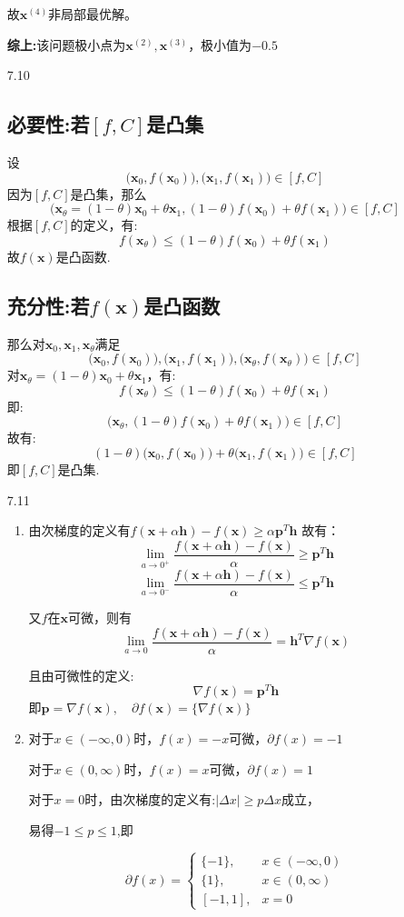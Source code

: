 \documentclass[UTF8]{ctexart}
\begin{document}
\begin{enumerate}
故$\bm{x}^{(4)}$非局部最优解。

\textbf{综上:}该问题极小点为$\bm{x}^{(2)},\bm{x}^{(3)}$，极小值为$-0.5$

\item[7.10]
\subsection*{必要性:若$[f,C]$是凸集}
设\[\big(\bm{x}_0,f(\bm{x}_0)\big),\big(\bm{x}_1,f(\bm{x}_1)\big)\in[f,C] \]
因为$[f,C]$是凸集，那么
\[\big(\bm{x}_\theta=(1-\theta)\bm{x}_0+\theta\bm{x}_1,(1-\theta)f(\bm{x}_0)+\theta f(\bm{x}_1)\big)\in[f,C] \]
根据$[f,C]$的定义，有:
\[f(\bm{x}_\theta)\leq (1-\theta)f(\bm{x}_0)+\theta f(\bm{x}_1)\]
故$f(\bm{x})$是凸函数.

\subsection*{充分性:若$f(\bm{x})$是凸函数}
那么对$\bm{x}_0,\bm{x}_1,\bm{x}_\theta$满足
\[\big(\bm{x}_0,f(\bm{x}_0)\big),\big(\bm{x}_1,f(\bm{x}_1)\big),\big(\bm{x}_\theta,f(\bm{x}_\theta)\big)\in[f,C] \]
对$\bm{x}_\theta=(1-\theta)\bm{x}_0+\theta\bm{x}_1$，有:
\[f(\bm{x}_\theta)\leq (1-\theta)f(\bm{x}_0)+\theta f(\bm{x}_1)\]
即:
\[\big(\bm{x}_\theta,(1-\theta)f(\bm{x}_0)+\theta f(\bm{x}_1)\big)\in[f,C] \]
故有:
\[(1-\theta)\big(\bm{x}_0,f(\bm{x}_0)\big)+\theta\big(\bm{x}_1,f(\bm{x}_1)\big)\in[f,C] \]
即$[f,C]$是凸集.

\item[7.11]
\begin{enumerate}
\item
由次梯度的定义有$f(\bm{x}+\alpha \bm{h})-f(\bm{x})\geq \alpha \bm{p}^T\bm{h}$
故有：
\[\lim _{a\rightarrow 0^{+}}\dfrac {f(\bm{x}+\alpha \bm{h})-f(\bm{x})}{\alpha}\geq \bm{p}^T\bm{h}\]
\[\lim _{a\rightarrow 0^{-}}\dfrac {f(\bm{x}+\alpha \bm{h})-f(\bm{x})}{\alpha}\leq \bm{p}^T\bm{h}\]

又$f$在$\bm{x}$可微，则有
\[\lim _{a\rightarrow 0}\dfrac {f(\bm{x}+\alpha \bm{h})-f(\bm{x})}{\alpha}=\bm{h}^T\nabla f(\bm{x})\]

且由可微性的定义:
\[\nabla f(\bm{x})=\bm{p}^T\bm{h}\]
即$\bm{p}=\nabla f(\bm{x}),\quad \partial f(\bm{x})=\{\nabla f(\bm{x})\}$

\item
对于$x \in (-\infty ,0)$时，$f(x)=-x$可微，$\partial f(x)=-1$

对于$x \in (0,\infty )$时，$f(x)=x$可微，$\partial f(x)=1$

对于$x =0$时，由次梯度的定义有:$|\Delta x|\geq p \Delta x$成立，

易得$-1\leq p\leq 1$,即

\[\partial f(x) = \begin{cases}
\{-1\},& x \in (-\infty ,0)\\
\{1\},& x \in (0,\infty )\\
[-1,1],&x=0
\end{cases}\]
\end{enumerate}
\end{enumerate}
\end{document}
